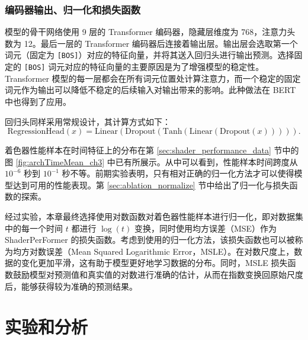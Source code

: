 \subsubsection{编码器输出、归一化和损失函数}

{} 模型的骨干网络使用 9 层的 Transformer 编码器，隐藏层维度为 768，注意力头数为 12。最后一层的 Transformer 编码器后连接着输出层。输出层会选取第一个词元（固定为 \verb|[BOS]|）对应的特征向量，并将其送入回归头进行输出预测。选择固定的 \verb|[BOS]| 词元对应的特征向量的主要原因是为了增强模型的稳定性。Transformer 模型的每一层都会在所有词元位置处计算注意力，而一个稳定的固定词元作为输出可以降低不稳定的后续输入对输出带来的影响。此种做法在 BERT \cite{devlin-etal-2019-bert}中也得到了应用。

{\amend 回归头同样采用常规设计，}其计算方式如下：
\begin{equation}
    \label{eq:reg_head}
    \text{RegressionHead}(x) = \text{Linear}(\text{Dropout}(\text{Tanh}(\text{Linear}(\text{Dropout}(x))))).
\end{equation}

{ 着色器性能样本在时间特征上的分布在第 \ref{sec:shader_performance_data} 节中的图 \ref{fig:archTimeMean_ch3} 中已有所展示。从中可以看到，}性能样本时间跨度从 $10^{-6}$ 秒到 $10^{-1}$ 秒不等。{\amend 前期实验表明，只有相对正确的归一化方法才可以使得模型达到可用的性能表现。第 \ref{sec:ablation_normalize} 节中给出了归一化与损失函数的探索。}

{\amend 经过实验，}本章最终选择使用对数函数对着色器性能样本进行归一化，即对数据集中的每一个时间 $t$ 都进行 $\log(t)$ 变换，同时使用均方误差（MSE）作为 ShaderPerFormer 的损失函数。考虑到使用的归一化方法，该损失函数也可以被称为均方对数误差（Mean Squared Logarithmic Error，MSLE）。在对数尺度上，数据的变化更加平滑，这有助于模型更好地学习数据的分布。同时，MSLE 损失函数鼓励模型对预测值和真实值的对数进行准确的估计，从而在指数变换回原始尺度后，能够获得较为准确的预测结果。

\section{{\amend 实验和分析}}


